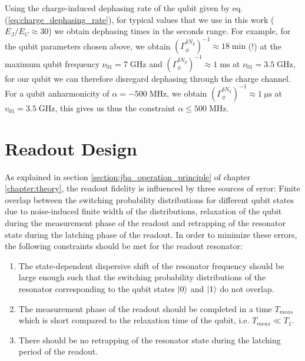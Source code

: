 Using the charge-induced dephasing rate of the qubit given by eq. (\ref{eq:charge_dephasing_rate}), for typical values that we use in this work ($E_J/E_C\approx 30$) we obtain dephasing times in the seconds range. For example, for the qubit parameters chosen above, we obtain $\left(\Gamma_{\phi}^{\delta N_g}\right)^{-1} \approx 18\;\mathrm{min}$ (!) at the maximum qubit frequency $\nu_{01}=7\;\mathrm{GHz}$ and  $\left(\Gamma_{\phi}^{\delta N_g}\right)^{-1} \approx 1\;\mathrm{ms}$ at $\nu_{01}=3.5\;\mathrm{GHz}$, for our qubit we can therefore disregard dephasing through the charge channel. For a qubit anharmonicity of $\alpha=-500\;\mathrm{MHz}$, we obtain $\left(\Gamma_{\phi}^{\delta N_g}\right)^{-1} \approx 1\;\mathrm{\mu s}$ at $v_{01}=3.5\;\mathrm{GHz}$, this gives us thus the constraint $\alpha\le 50	0 \;\mathrm{MHz}$. 

\section{Readout Design}

As explained in section \ref{section:jba_operation_principle} of chapter \ref{chapter:theory}, the readout fidelity is influenced by three sources of error: Finite overlap between the switching probability distributions for different qubit states due to noise-induced finite width of the distributions, relaxation of the qubit during the measurement phase of the readout and retrapping of the resonator state during the latching phase of the readout. In order to minimize these errors, the following constraints should be met for the readout resonator:

\begin{enumerate}
\item The state-dependent dispersive shift of the resonator frequency should be large enough such that the switching probability distributions of the resonator corresponding to the qubit states $\left| 0 \right>$ and $\left| 1 \right>$ do not overlap.
\item The measurement phase of the readout should be completed in a time $T_{meas}$ which is short compared to the relaxation time of the qubit, i.e. $T_{meas}\ll T_1$.
\item There should be no retrapping of the resonator state during the latching period of the readout.
\end{enumerate}

